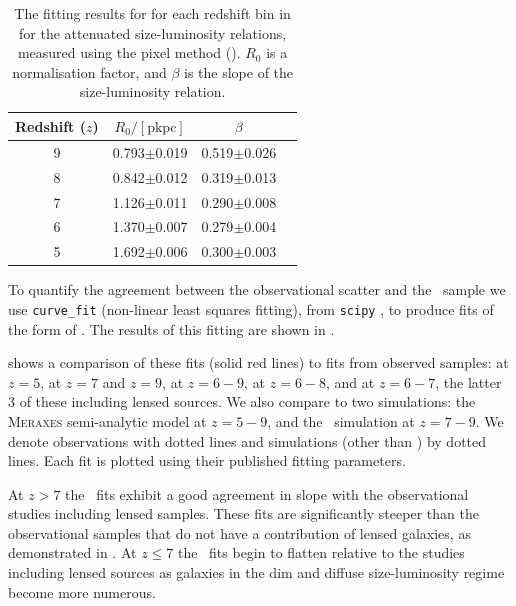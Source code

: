 \begin{table}
\begin{center}
\begin{tabular}{ c | c | c | c }
 \hline
 Redshift ($z$) 
 & $R_0/ [\mathrm{pkpc}]$ & $\beta$ \\ \hline
 9 
 & 0.793$\pm$0.019 & 0.519$\pm$0.026 \\
 8 
 & 0.842$\pm$0.012 & 0.319$\pm$0.013 \\  
 7 
 & 1.126$\pm$0.011 & 0.290$\pm$0.008 \\
 6 
 & 1.370$\pm$0.007 & 0.279$\pm$0.004 \\
 5 
 & 1.692$\pm$0.006 & 0.300$\pm$0.003 \\
 \hline
\end{tabular}
\caption{The fitting results for  for each redshift bin in  for the attenuated size-luminosity relations, measured using the pixel method (). $R_0$ is a normalisation factor, and $\beta$ is the slope of the size-luminosity relation.}
\label{tab:rfit}
\end{center}
\end{table}

To quantify the agreement between the observational scatter and the \flares\ sample we use \texttt{curve\_fit} (non-linear least squares fitting), from \texttt{scipy} \citep{2020SciPy-NMeth}, to produce fits of the form of . The results of this fitting are shown in .

 shows a comparison of these fits (solid red lines) to fits from observed samples: \cite{Huang_2013} at $z=5$, \cite{Holwerda_2015} at $z=7$ and $z=9$, \cite{Kawamata_2018} at $z=6-9$, \cite{Bouwens2021} at $z=6-8$, and \cite{Yang2022} at $z=6-7$, the latter 3 of these including lensed sources. We also compare to two simulations: the \textsc{Meraxes} semi-analytic model \citep{Liu_meraxes, Marshall2019} at $z=5-9$, and the \bluetides\ simulation \citep{Marshall21} at $z=7-9$. We denote observations with dotted lines and simulations (other than \flares) by dotted lines. Each fit is plotted using their published fitting parameters.

At $z>7$ the \flares\ fits exhibit a good agreement in slope with the observational studies including lensed samples. These fits are significantly steeper than the observational samples that do not have a contribution of lensed galaxies, as demonstrated in \cite{Bouwens2021}. At $z\leq7$ the \flares\ fits begin to flatten relative to the studies including lensed sources as galaxies in the dim and diffuse size-luminosity regime become more numerous. 

